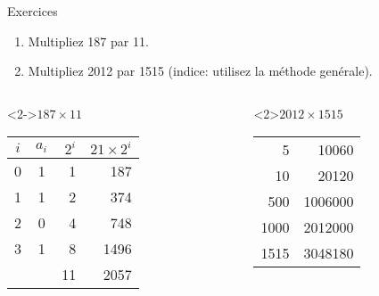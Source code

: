 \begin{frame}{Exercices}
  
  \begin{enumerate}
  \item Multipliez 187 par 11.
  \item Multipliez 2012 par 1515 (indice: utilisez la méthode genérale).
  \end{enumerate}
\begin{columns}
\begin{column}[t]{0.48\textwidth}
  \begin{exampleblock}<2->{$187\times 11$}
    \begin{tabular}{c|c|r|r}
        $i$ & $a_i$ & $2^i$ & $21 \times 2^i$ \\
        \hline
        0& 1 & 1 & 187\\
        1& 1 & 2 & 374\\
        2& 0 & 4 & 748\\
        3& 1 & 8 & 1496\\ \hline
        &  & 11 &2057
      \end{tabular}    
  \end{exampleblock}
\end{column}
\begin{column}[t]{0.48\textwidth}
    \begin{exampleblock}<2>{$2012\times 1515$}
      \begin{tabular}{r|r}
        5& 10060 \\
        10& 20120 \\
        500 & 1006000 \\
        1000 & 2012000\\ \hline
        1515 & 3048180 
      \end{tabular}
  \end{exampleblock}
\end{column}
\end{columns}

\end{frame}


